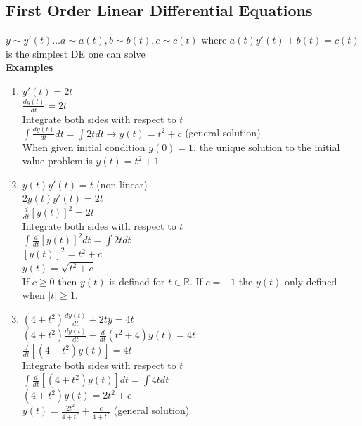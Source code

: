 \documentclass{article}
\begin{document}
\subsection{First Order Linear Differential Equations}
\label{sec:flinear}
$y\sim y'(t)\dots a\sim a(t), b\sim b(t), c\sim c(t)$ where $a(t)y'(t)+b(t)=c(t)$ is the simplest DE one can solve\\
\textbf{Examples}
\begin{enumerate}
    \item $y'(t)=2t$\\
    $\frac{dy(t)}{dt}=2t$\\
    Integrate both sides with respect to $t$\\
    $\int\frac{dy(t)}{dt}dt=\int2tdt\rightarrow y(t)=t^2+c$ (general solution)\\
    When given initial condition $y(0)=1$, the unique solution to the initial value problem is $y(t)=t^2+1$
    \item $y(t)y'(t)=t$ (non-linear)\\
    $2y(t)y'(t)=2t$\\
    $\frac{d}{dt}[y(t)]^2=2t$\\
    Integrate both sides with respect to $t$\\
    $\int\frac{d}{dt}[y(t)]^2dt=\int 2tdt$\\
    $[y(t)]^2=t^2+c$\\
    $y(t)=\sqrt{t^2+c}$\\
    If $c\geq 0$ then $y(t)$ is defined for $t\in\mathbb{R}$. If $c=-1$ the $y(t)$ only defined when $\vert t \vert\geq 1$.
    \item $(4+t^2)\frac{dy(t)}{dt}+2ty=4t$\\
    $(4+t^2)\frac{dy(t)}{dt}+\frac{d}{dt}(t^2+4)y(t)=4t$\\
    $\frac{d}{dt}[(4+t^2)y(t)]=4t$\\
    Integrate both sides with respect to $t$\\
    $\int\frac{d}{dt}[(4+t^2)y(t)]dt=\int 4tdt$\\
    $(4+t^2)y(t)=2t^2+c$\\
    $y(t)=\frac{2t^2}{4+t^2}+\frac{c}{4+t^2}$ (general solution)
\end{enumerate}
\end{document}
